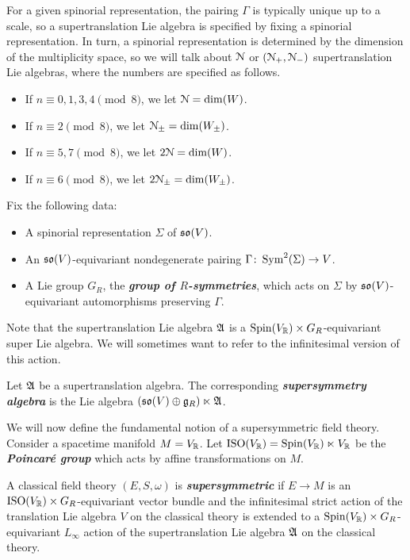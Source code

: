\documentclass[10pt, oneside]{article}
\newcommand{\defterm}[1]{\textbf{\emph{#1}}}
\begin{document}
For a given spinorial representation, the pairing $\Gamma$ is typically unique up to a scale, so a supertranslation Lie algebra is specified by fixing a spinorial representation. In turn, a spinorial representation is determined by the dimension of the multiplicity space, so we will talk about $\mathcal{N}$ or $(\mathcal{N}_+, \mathcal{N}_-)$ supertranslation Lie algebras, where the numbers are specified as follows.
\begin{itemize}
\item If $n\equiv 0, 1, 3, 4\pmod 8$, we let $\mathcal{N} = \dim(W)$.

\item If $n\equiv 2 \pmod 8$, we let $\mathcal{N}_{\pm}=\dim(W_{\pm})$.

\item If $n\equiv 5, 7\pmod 8$, we let $2\mathcal{N} = \dim(W)$.

\item If $n\equiv 6\pmod 8$, we let $2\mathcal{N}_{\pm} = \dim(W_{\pm})$.
\end{itemize}

Fix the following data:
\begin{itemize}
\item A spinorial representation $\Sigma$ of $\mathfrak{so}(V)$.

\item An $\mathfrak{so}(V)$-equivariant nondegenerate pairing $\Gamma\colon \operatorname{Sym}^2(\Sigma)\rightarrow V$.

\item A Lie group $G_R$, the \defterm{group of $R$-symmetries}, which acts on $\Sigma$ by $\mathfrak{so}(V)$-equivariant automorphisms preserving $\Gamma$.
\end{itemize}

Note that the supertranslation Lie algebra $\mathfrak A$ is a $\mathrm{Spin}(V_\mathbb R)\times G_R$-equivariant super Lie algebra.  We will sometimes want to refer to the infinitesimal version of this action.
\begin{definition}
Let $\mathfrak A$ be a supertranslation algebra.  The corresponding \defterm{supersymmetry algebra} is the Lie algebra $(\mathfrak{so}(V) \oplus \mathfrak{g}_R) \ltimes \mathfrak A$.
\end{definition}

We will now define the fundamental notion of a supersymmetric field theory.  Consider a spacetime manifold $M=V_\mathbb R$. Let $\mathrm{ISO}(V_\mathbb R) = \mathrm{Spin}(V_\mathbb R)\ltimes V_\mathbb R$ be the \defterm{Poincar\'{e} group} which acts by affine transformations on $M$.

\begin{definition}
\label{dfn: super}
A classical field theory $(E, S, \omega)$ is \defterm{supersymmetric} if $E\rightarrow M$ is an $\mathrm{ISO}(V_\mathbb R)\times G_R$-equivariant vector bundle and the infinitesimal strict action of the translation Lie algebra $V$ on the classical theory is extended to a $\mathrm{Spin}(V_\mathbb R)\times G_R$-equivariant $L_\infty$ action of the supertranslation Lie algebra $\mathfrak A$ on the classical theory.
\end{definition}
\end{document}
